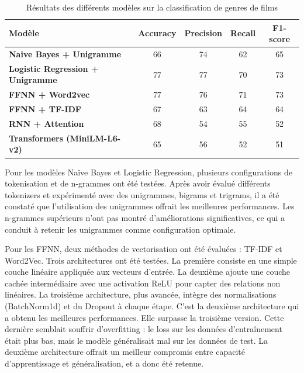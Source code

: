 \documentclass[12pt]{report}
\begin{document}
\begin{table}[H]
\centering
\begin{tabular}{|l|c|c|c|c|}
\hline
\textbf{Modèle} & \textbf{Accuracy} & \textbf{Precision} & \textbf{Recall} & \textbf{F1-score} \\
\hline
\textbf{Naive Bayes + Unigramme}        & 66 & 74 & 62 & 65 \\
\textbf{Logistic Regression + Unigramme} & 77 & 77 & 70 & 73 \\
\textbf{FFNN + Word2vec}                 & 77 & 76 & 71 & 73 \\
\textbf{FFNN + TF-IDF}                   & 67 & 63 & 64 & 64 \\
\textbf{RNN + Attention}                & 68 & 54 & 55 & 52 \\
\textbf{Transformers (MiniLM-L6-v2)}    & 65 & 56 & 52 & 51 \\
\hline
\end{tabular}
\caption{Résultats des différents modèles sur la classification de genres de films}
\label{tab:resultats_modeles}
\end{table}

Pour les modèles Naïve Bayes et Logistic Regression, plusieurs configurations de tokenisation et de n-grammes ont été testées. Après avoir évalué différents tokenizers et expérimenté avec des unigrammes, bigrams et trigrams, il a été constaté que l'utilisation des unigrammes offrait les meilleures performances. Les n-grammes supérieurs n'ont pas montré d'améliorations significatives, ce qui a conduit à retenir les unigrammes comme configuration optimale. 

Pour les FFNN, deux méthodes de vectorisation ont été évaluées : TF-IDF et Word2Vec. Trois architectures ont été testées. La première consiste en une simple couche linéaire appliquée aux vecteurs d’entrée. La deuxième ajoute une couche cachée intermédiaire avec une activation ReLU pour capter des relations non linéaires. La troisième architecture, plus avancée, intègre des normalisations (BatchNorm1d) et du Dropout à chaque étape. C’est la deuxième architecture qui a obtenu les meilleures performances. Elle surpasse la troisième version. Cette dernière semblait souffrir d’overfitting : le loss sur les données d’entraînement était plus bas, mais le modèle généralisait mal sur les données de test. La deuxième architecture offrait un meilleur compromis entre capacité d’apprentissage et généralisation, et a donc été retenue. 
\end{document}
